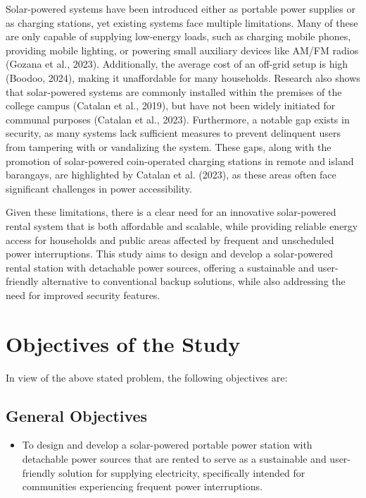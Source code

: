 {Solar-powered systems have been introduced either as portable power supplies or as charging stations, yet existing systems face multiple limitations. Many of these are only capable of supplying low-energy loads, such as charging mobile phones, providing mobile lighting, or powering small auxiliary devices like AM/FM radios (Gozana et al., 2023). Additionally, the average cost of an off-grid setup is high (Boodoo, 2024), making it unaffordable for many households. Research also shows that solar-powered systems are commonly installed within the premises of the college campus (Catalan et al., 2019), but have not been widely initiated for communal purposes (Catalan et al., 2023). Furthermore, a notable gap exists in security, as many systems lack sufficient measures to prevent delinquent users from tampering with or vandalizing the system. These gaps, along with the promotion of solar-powered coin-operated charging stations in remote and island barangays, are highlighted by Catalan et al. (2023), as these areas often face significant challenges in power accessibility.

Given these limitations, there is a clear need for an innovative solar-powered rental system that is both affordable and scalable, while providing reliable energy access for households and public areas affected by frequent and unscheduled power interruptions. This study aims to design and develop a solar-powered rental station with detachable power sources, offering a sustainable and user-friendly alternative to conventional backup solutions, while also addressing the need for improved security features.

\section{Objectives of the Study}

In view of the above stated problem, the following objectives are:
\subsection{General Objectives}
\begin{itemize}
	\item To design and develop a solar-powered portable power station with detachable power sources that are rented to serve as a sustainable and user-friendly solution for supplying electricity, specifically intended for communities experiencing frequent power interruptions. 
\end{itemize}
}
